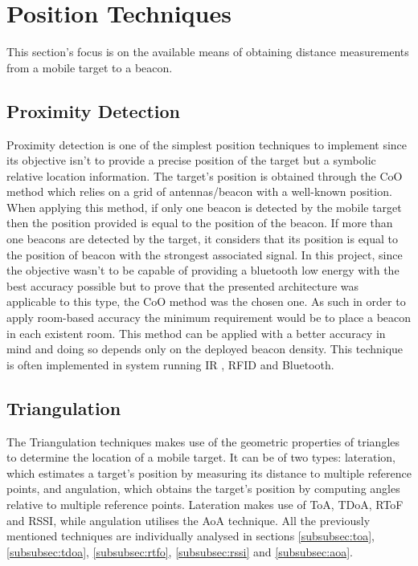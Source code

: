 \section{Position Techniques}
\label{sec:techniques}

This section's focus is on the available means of obtaining distance measurements from a mobile target to a beacon.  

\subsection{Proximity Detection}
\label{subsec:prox}

Proximity detection is one of the simplest position techniques to implement since its objective isn't to provide a precise position of the target but a symbolic relative location information. The target's position is obtained through the \ac{CoO} method which relies on a grid of antennas/beacon with a well-known position. When applying this method, if only one beacon is detected by the mobile target then the position provided is equal to the position of the beacon. If more than one beacons are detected by the target, it considers that its position is equal to the position of beacon with the strongest associated signal. In this project, since the objective wasn't to be capable of providing a bluetooth low energy with the best accuracy possible but to prove that the presented architecture was applicable to this type, the \ac{CoO} method was the chosen one. As such in order to apply room-based accuracy the minimum requirement would be to place a beacon in each existent room. This method can be applied with a better accuracy in mind and doing so depends only on the deployed beacon density. This technique is often implemented in system running \ac{IR} , \ac{RFID} and Bluetooth.

\subsection{Triangulation}
\label{subsec:tri}

The Triangulation techniques makes use of the geometric properties of triangles to determine the location of a mobile target. It can be of two types: lateration, which estimates a target's position by measuring its distance to multiple reference points, and angulation, which obtains the target's position by computing angles relative to multiple reference points. Lateration makes use of \ac{ToA}, \ac{TDoA}, \ac{RToF} and \ac{RSSI}, while angulation utilises the \ac{AoA} technique. All the previously mentioned techniques are individually analysed in sections \ref{subsubsec:toa}, \ref{subsubsec:tdoa}, \ref{subsubsec:rtfo}, \ref{subsubsec:rssi} and \ref{subsubsec:aoa}. 

